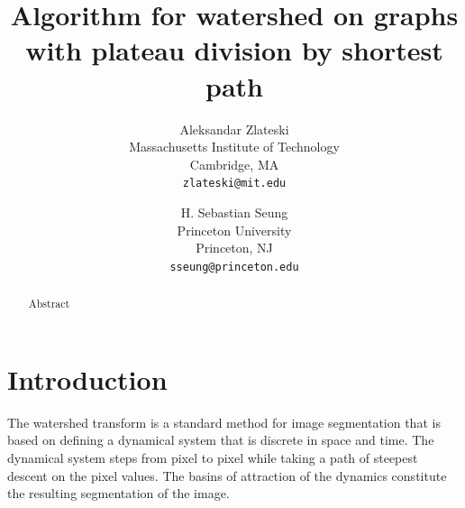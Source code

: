 \documentclass{article}\usepackage{times}
\begin{document}

\title{Algorithm for watershed on graphs with plateau division by shortest path}

\author{
Aleksandar Zlateski\\ Massachusetts Institute of Technology\\ Cambridge, MA\\
{\tt\small zlateski@mit.edu}
\and
H. Sebastian Seung\\ Princeton University\\ Princeton, NJ\\
{\tt\small sseung@princeton.edu}
}



\maketitle



\begin{abstract}
Abstract
\end{abstract}


\section{Introduction}
The watershed transform is a standard method for image segmentation
that is based on defining a dynamical system that is discrete in space
and time.  The dynamical system steps from pixel to pixel while taking
a path of steepest descent on the pixel values.  The basins of
attraction of the dynamics constitute the resulting segmentation of
the image.
\end{document}
